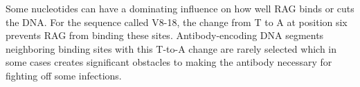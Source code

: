 \documentclass[11pt, oneside]{article}   	%
\begin{document}
Some nucleotides can have a dominating influence on how well RAG binds or
cuts the DNA. For the sequence called V8-18, the change from T to A at
position six prevents RAG from binding these sites. Antibody-encoding DNA
segments neighboring binding sites with this T-to-A change are rarely
selected which in some cases creates significant obstacles to making the antibody
necessary for fighting off some infections.
\end{document}
